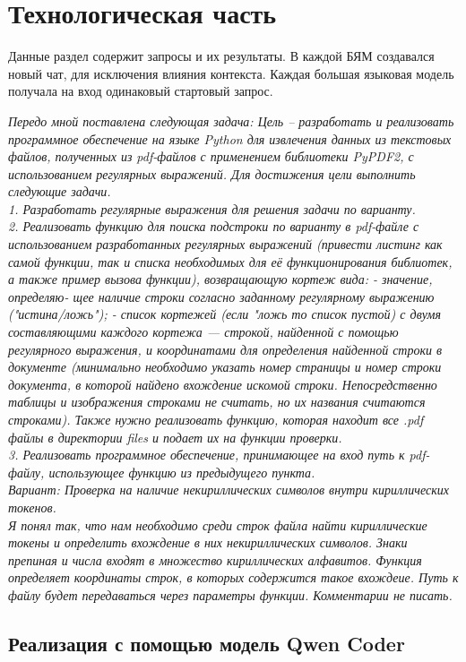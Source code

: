 \chapter{Технологическая часть}

Данные раздел содержит запросы и их результаты. В каждой БЯМ создавался новый чат, для исключения влияния контекста. 
Каждая большая языковая модель получала на вход одинаковый стартовый запрос.

\textit{Передо мной поставлена следующая задача: Цель – разработать и реализовать программное
обеспечение на языке Python для извлечения данных из текстовых файлов, полученных из pdf-файлов с применением библиотеки PyPDF2,
с использованием регулярных выражений.
Для достижения цели выполнить следующие задачи.\\
1. Разработать регулярные выражения для решения задачи по варианту.\\
2. Реализовать функцию для поиска подстроки по варианту в pdf-файле с использованием разработанных регулярных выражений (привести
листинг как самой функции, так и списка необходимых для её функционирования библиотек, а также пример вызова функции), возвращающую кортеж вида: - значение, определяю-
щее наличие строки согласно заданному регулярному выражению ("истина/ложь"); - список
кортежей (если "ложь то список пустой) с двумя составляющими каждого кортежа —
строкой, найденной с помощью регулярного выражения, и координатами для определения
найденной строки в документе (минимально необходимо указать номер страницы и номер
строки документа, в которой найдено вхождение искомой строки. Непосредственно таблицы
и изображения строками не считать, но их названия считаются строками).
Также нужно реализовать функцию, которая находит все .pdf файлы в директории files и подает их на функции проверки. \\
3. Реализовать программное обеспечение, принимающее на вход путь к pdf-файлу, использующее функцию из предыдущего пункта.\\
Вариант: Проверка на наличие некириллических символов внутри кириллических токенов. \\
Я понял так, что нам необходимо среди строк файла найти кириллические токены
и определить вхождение в них некириллических символов.
Знаки препиная и числа входят в множество кириллических алфавитов.
Функция определяет координаты строк, в которых содержится такое вхождеие.
Путь к файлу будет передаваться через параметры функции. Комментарии не писать.}

\section{Реализация с помощью модель Qwen Coder}

